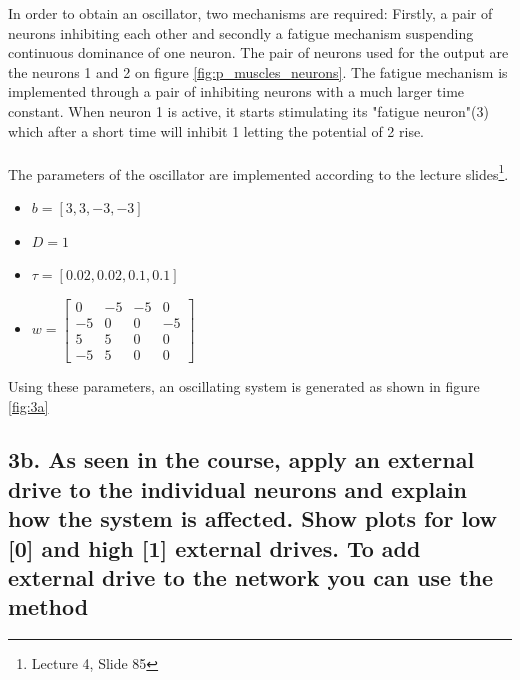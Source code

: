 \documentclass{cmc}
\begin{document}
    In order to obtain an oscillator, two mechanisms are required: Firstly, a pair of neurons inhibiting each other and secondly a fatigue mechanism suspending continuous dominance of one neuron. The pair of neurons used for the output are the neurons 1 and 2 on figure \ref{fig:p_muscles_neurons}. The fatigue mechanism is implemented through a pair of inhibiting neurons with a much larger time constant. When neuron 1 is active, it starts stimulating its "fatigue neuron"(3) which after a short time will inhibit 1 letting the potential of 2 rise.\\
    \\
    The parameters of the oscillator are implemented according to the lecture slides\footnote{Lecture 4, Slide 85}.
    \begin{itemize}
        \item $b = [3,3,-3,-3]$
        \item $D = 1$
        \item $\tau = [0.02, 0.02, 0.1, 0.1]$
        \item $w=\begin{bmatrix}
                0  & -5 & -5 &  0\\
                -5 &  0 &  0 & -5\\
                 5 &  5 &  0 &  0\\
                -5 &  5 &  0 &  0
                \end{bmatrix}$
    \end{itemize}
    Using these parameters, an oscillating system is generated as shown in figure \ref{fig:3a}

\vfill
\clearpage

\subsection*{3b. As seen in the course, apply an external drive to the
  individual neurons and explain how the system is affected. Show
  plots for low [0] and high [1] external drives. To add external
  drive to the network you can use the method \\
   }
\label{sec:4c}
\end{document}
